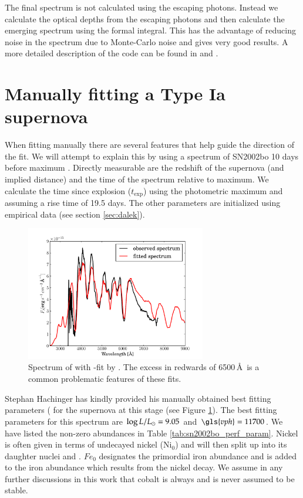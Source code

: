 The final spectrum is not calculated using the escaping photons. Instead we calculate the optical depths from the escaping photons and then calculate the emerging spectrum using the formal integral. 
This has the advantage of reducing noise in the spectrum due to Monte-Carlo noise and gives very good results. A more detailed description of the code can be found in  \citet{1993A&A...279..447M} and \citet{2000A&A...363..705M}.


\section{Manually fitting a Type Ia supernova}
\label{sec:manual_sneia}
When fitting manually there are several features that help guide the direction of the fit. We will attempt to explain this by using a spectrum of SN2002bo 10 days before maximum \citep{2004MNRAS.348..261B}. 
Directly measurable are the redshift of the supernova (and implied distance) and the time of the spectrum relative to maximum. We calculate the time since explosion ($t_\textrm{exp}$) using the photometric maximum and assuming a rise time of 19.5 days.
The other parameters are initialized using empirical data (see section \ref{sec:dalek}). 

\begin{figure}[htbp] %
   \centering
   \includegraphics[width=0.7\textwidth]{chapter_dalek/plots/bf2002bo-10.pdf} 
   \caption{Spectrum of  \citep{2004MNRAS.348..261B} with -fit by \citet{hachinger_dipl2007}. The excess in redwards of 6500\,\AA\ is a common problematic features of these fits.}
   \label{fig:sn2002bo-10_bf}
\end{figure}

Stephan Hachinger has kindly provided his manually obtained best fitting parameters ( for the supernova at this stage (see Figure \ref{fig:sn2002bo-10_bf}).
The best fitting parameters for this spectrum are $\log{L/L_\odot}=9.05$ and $\gls{vph}=11700$. We have listed the non-zero abundances in Table \ref{tab:sn2002bo_perf_param}. Nickel is often given in terms of undecayed nickel ($\textrm{Ni}_0$) and will then split up into its daughter nuclei \Co and \Fe. $Fe_0$ designates the primordial iron abundance and is added to the iron abundance which results from the  nickel decay. We assume in any further discussions in this work that cobalt is always \Co and is never assumed to be stable. 

